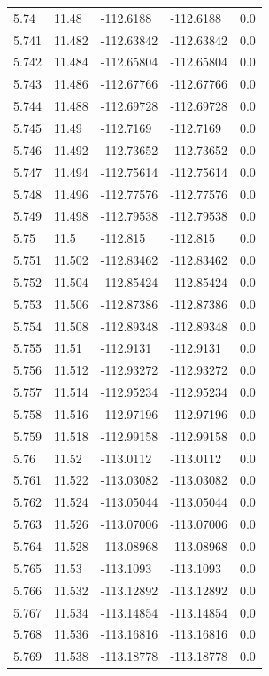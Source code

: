 \begin{tabular}{lllll}
5.74 & 11.48 & -112.6188 & -112.6188 & 0.0 \\
5.741 & 11.482 & -112.63842 & -112.63842 & 0.0 \\
5.742 & 11.484 & -112.65804 & -112.65804 & 0.0 \\
5.743 & 11.486 & -112.67766 & -112.67766 & 0.0 \\
5.744 & 11.488 & -112.69728 & -112.69728 & 0.0 \\
5.745 & 11.49 & -112.7169 & -112.7169 & 0.0 \\
5.746 & 11.492 & -112.73652 & -112.73652 & 0.0 \\
5.747 & 11.494 & -112.75614 & -112.75614 & 0.0 \\
5.748 & 11.496 & -112.77576 & -112.77576 & 0.0 \\
5.749 & 11.498 & -112.79538 & -112.79538 & 0.0 \\
5.75 & 11.5 & -112.815 & -112.815 & 0.0 \\
5.751 & 11.502 & -112.83462 & -112.83462 & 0.0 \\
5.752 & 11.504 & -112.85424 & -112.85424 & 0.0 \\
5.753 & 11.506 & -112.87386 & -112.87386 & 0.0 \\
5.754 & 11.508 & -112.89348 & -112.89348 & 0.0 \\
5.755 & 11.51 & -112.9131 & -112.9131 & 0.0 \\
5.756 & 11.512 & -112.93272 & -112.93272 & 0.0 \\
5.757 & 11.514 & -112.95234 & -112.95234 & 0.0 \\
5.758 & 11.516 & -112.97196 & -112.97196 & 0.0 \\
5.759 & 11.518 & -112.99158 & -112.99158 & 0.0 \\
5.76 & 11.52 & -113.0112 & -113.0112 & 0.0 \\
5.761 & 11.522 & -113.03082 & -113.03082 & 0.0 \\
5.762 & 11.524 & -113.05044 & -113.05044 & 0.0 \\
5.763 & 11.526 & -113.07006 & -113.07006 & 0.0 \\
5.764 & 11.528 & -113.08968 & -113.08968 & 0.0 \\
5.765 & 11.53 & -113.1093 & -113.1093 & 0.0 \\
5.766 & 11.532 & -113.12892 & -113.12892 & 0.0 \\
5.767 & 11.534 & -113.14854 & -113.14854 & 0.0 \\
5.768 & 11.536 & -113.16816 & -113.16816 & 0.0 \\
5.769 & 11.538 & -113.18778 & -113.18778 & 0.0 \\

\end{tabular}
